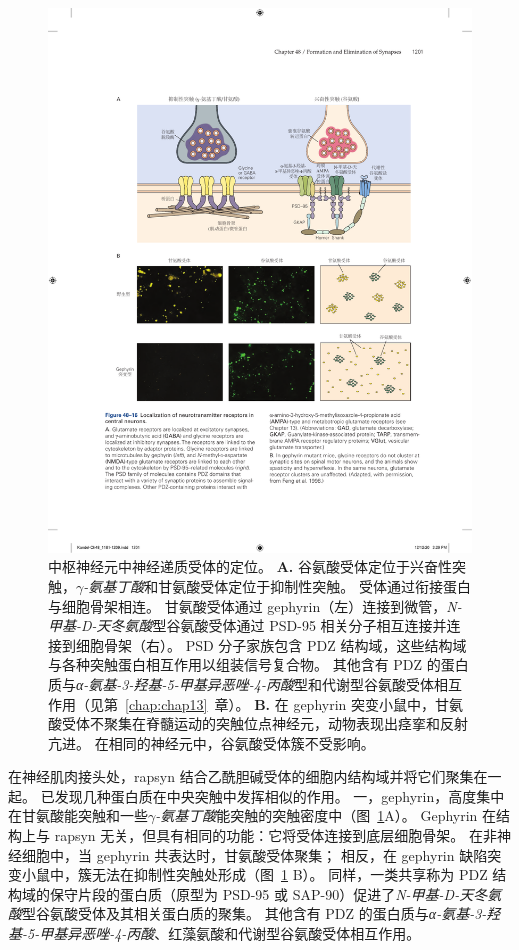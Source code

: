 \begin{figure}[htbp]
	\centering
	\includegraphics[width=0.8\linewidth]{chap48/fig_48_16}
	\caption{中枢神经元中神经递质受体的定位。
		\textbf{A.} 谷氨酸受体定位于兴奋性突触，\textit{$ \gamma $-氨基丁酸}和甘氨酸受体定位于抑制性突触。
		受体通过衔接蛋白与细胞骨架相连。
		甘氨酸受体通过 gephyrin（左）连接到微管，\textit{N-甲基-D-天冬氨酸}型谷氨酸受体通过 PSD-95 相关分子相互连接并连接到细胞骨架（右）。
		PSD 分子家族包含 PDZ 结构域，这些结构域与各种突触蛋白相互作用以组装信号复合物。
		其他含有 PDZ 的蛋白质与\textit{α-氨基-3-羟基-5-甲基异恶唑-4-丙酸}型和代谢型谷氨酸受体相互作用（见第~\ref{chap:chap13}~章）。
		\textbf{B.} 在 gephyrin 突变小鼠中，甘氨酸受体不聚集在脊髓运动的突触位点神经元，动物表现出痉挛和反射亢进。
		在相同的神经元中，谷氨酸受体簇不受影响\cite{feng1998dual}。}
	\label{fig:48_16}
\end{figure}


在神经肌肉接头处，rapsyn 结合乙酰胆碱受体的细胞内结构域并将它们聚集在一起。
已发现几种蛋白质在中央突触中发挥相似的作用。
一，gephyrin，高度集中在甘氨酸能突触和一些\textit{$ \gamma $-氨基丁酸}能突触的突触密度中（图~\ref{fig:48_16}A）。 Gephyrin 在结构上与 rapsyn 无关，但具有相同的功能：它将受体连接到底层细胞骨架。
在非神经细胞中，当 gephyrin 共表达时，甘氨酸受体聚集；
相反，在 gephyrin 缺陷突变小鼠中，簇无法在抑制性突触处形成（图~\ref{fig:48_16} B）。
同样，一类共享称为 PDZ 结构域的保守片段的蛋白质（原型为 PSD-95 或 SAP-90）促进了\textit{N-甲基-D-天冬氨酸}型谷氨酸受体及其相关蛋白质的聚集。
其他含有 PDZ 的蛋白质与\textit{α-氨基-3-羟基-5-甲基异恶唑-4-丙酸}、红藻氨酸和代谢型谷氨酸受体相互作用。



